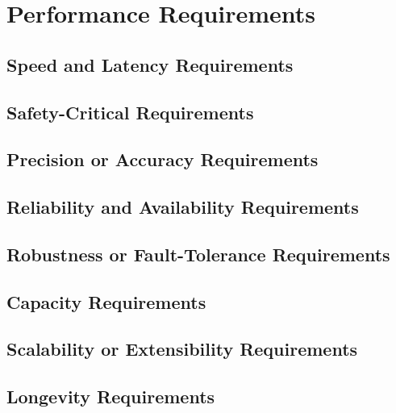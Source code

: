 \section{Performance Requirements}
\subsection{Speed and Latency Requirements}
\subsection{Safety-Critical Requirements}
\subsection{Precision or Accuracy Requirements}
\subsection{Reliability and Availability Requirements}
\subsection{Robustness or Fault-Tolerance Requirements}
\subsection{Capacity Requirements}
\subsection{Scalability or Extensibility Requirements}
\subsection{Longevity Requirements}